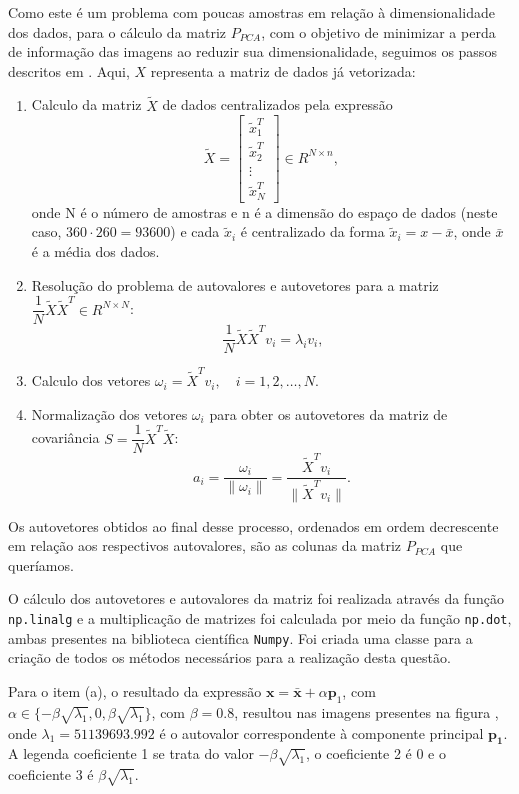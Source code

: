 \documentclass[a4paper, 11pt]{article}
\begin{document}
Como este é um problema com poucas amostras em relação à dimensionalidade dos dados, para o cálculo da matriz $P_{PCA}$, com o objetivo de minimizar a perda de informação das imagens ao reduzir sua dimensionalidade, seguimos os passos descritos em \cite{miranda2023abordagens}. Aqui, $X$ representa a matriz de dados já vetorizada: 

\begin{enumerate}
    \item Calculo da matriz $\tilde{X}$ de dados centralizados pela expressão \[\tilde{X} = \begin{bmatrix}
    \tilde{x}_1^T \\
    \tilde{x}_2^T \\
    \vdots \\
    \tilde{x}_N^T
    \end{bmatrix}
    \in {R}^{N \times n},\]
    onde N é o número de amostras e n é a dimensão do espaço de dados (neste caso, $360 \cdot 260=93600$) e cada $\tilde{x}_i$ é centralizado da forma $\tilde{x}_i=x-\bar{x}$, onde $\bar{x}$ é a média dos dados.
    \item Resolução do problema de autovalores e autovetores para a matriz $\dfrac{1}{N} \tilde{X} \tilde{X}^T \in {R}^{N \times N}$:
    \[
    \ \dfrac{1}{N}\tilde{X} \tilde{X}^T v_i = \lambda_i v_i,
    \]
    \item Calculo dos vetores $\omega_i = \tilde{X}^T v_i, \quad i = 1, 2, \dots, N.$
    \item Normalização dos vetores $\omega_i$ para obter os autovetores da matriz de covariância $S = \dfrac{1}{N} \tilde{X}^T \tilde{X}$:
    \[
    a_i = \frac{\omega_i}{\|\omega_i\|} = \frac{\tilde{X}^T v_i}{\|\tilde{X}^T v_i\|}.
    \]
\end{enumerate}

Os autovetores obtidos ao final desse processo, ordenados em ordem decrescente em relação aos respectivos autovalores, são as colunas da matriz $P_{PCA}$ que queríamos. 

O cálculo dos autovetores e autovalores da matriz foi realizada através da função \texttt{np.linalg} e a multiplicação de matrizes foi calculada por meio da função \texttt{np.dot}, ambas presentes na biblioteca científica \texttt{Numpy}. Foi criada uma classe para a criação de todos os métodos necessários para a realização desta questão.

Para o item (a), o resultado da expressão $\mathbf{x} = \bar{\mathbf{x}} + \alpha \mathbf{p}_1$, com $\alpha \in \{-\beta\sqrt{\lambda_1}, 0, \beta\sqrt{\lambda_1}\}$, com $\beta=0.8$, resultou nas imagens presentes na figura , onde $\lambda_1 = 51139693.992$ é o autovalor correspondente à componente principal $\mathbf{p_1}$. A legenda coeficiente 1 se trata do valor $-\beta\sqrt{\lambda_1}$, o coeficiente 2 é 0 e o coeficiente 3 é $\beta\sqrt{\lambda_1}$. 
\end{document}
